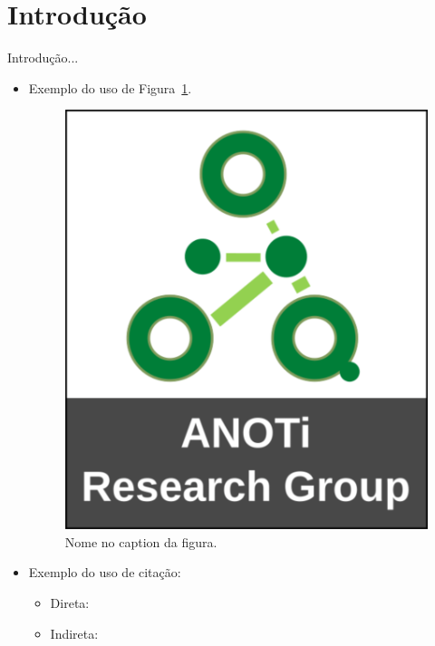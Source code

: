 \section{Introdução}

Introdução...

\begin{itemize}
    \item Exemplo do uso de Figura~\ref{fig:name}.
    
    \begin{figure}[!htb]
    \centering
    \includegraphics[scale=.1]{_fig/anoti.png}
    \caption[Nome na tabela de figuras.]{Nome no caption da figura.}
    \label{fig:name}
    \end{figure}

    \item Exemplo do uso de citação:
    \begin{itemize}
        \item Direta: 
        \item Indireta: \cite{Silva2019}
    \end{itemize}
    

\end{itemize}
